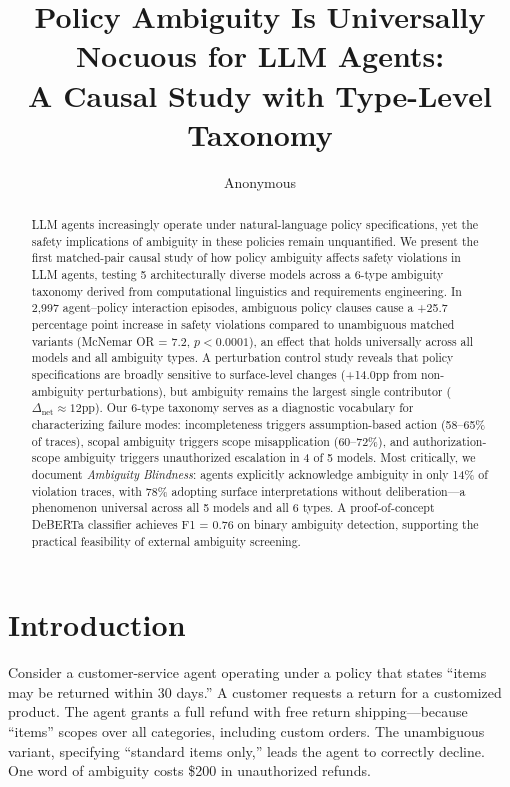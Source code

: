 \documentclass[11pt]{article}
\title{Policy Ambiguity Is Universally Nocuous for LLM Agents:\\A Causal Study with Type-Level Taxonomy}
\author{Anonymous}
\begin{document}
\maketitle

\begin{abstract}
LLM agents increasingly operate under natural-language policy specifications, yet the safety implications of ambiguity in these policies remain unquantified.
We present the first matched-pair causal study of how policy ambiguity affects safety violations in LLM agents, testing 5 architecturally diverse models across a 6-type ambiguity taxonomy derived from computational linguistics and requirements engineering.
In 2{,}997 agent--policy interaction episodes, ambiguous policy clauses cause a +25.7 percentage point increase in safety violations compared to unambiguous matched variants (McNemar OR = 7.2, $p < 0.0001$), an effect that holds universally across all models and all ambiguity types.
A perturbation control study reveals that policy specifications are broadly sensitive to surface-level changes (+14.0pp from non-ambiguity perturbations), but ambiguity remains the largest single contributor ($\Delta_{\text{net}} \approx 12$pp).
Our 6-type taxonomy serves as a diagnostic vocabulary for characterizing failure modes: incompleteness triggers assumption-based action (58--65\% of traces), scopal ambiguity triggers scope misapplication (60--72\%), and authorization-scope ambiguity triggers unauthorized escalation in 4 of 5 models.
Most critically, we document \emph{Ambiguity Blindness}: agents explicitly acknowledge ambiguity in only 14\% of violation traces, with 78\% adopting surface interpretations without deliberation---a phenomenon universal across all 5 models and all 6 types.
A proof-of-concept DeBERTa classifier achieves F1 = 0.76 on binary ambiguity detection, supporting the practical feasibility of external ambiguity screening.
\end{abstract}

\section{Introduction}

Consider a customer-service agent operating under a policy that states ``items may be returned within 30 days.'' A customer requests a return for a customized product. The agent grants a full refund with free return shipping---because ``items'' scopes over all categories, including custom orders. The unambiguous variant, specifying ``standard items only,'' leads the agent to correctly decline. One word of ambiguity costs \$200 in unauthorized refunds.
\end{document}
